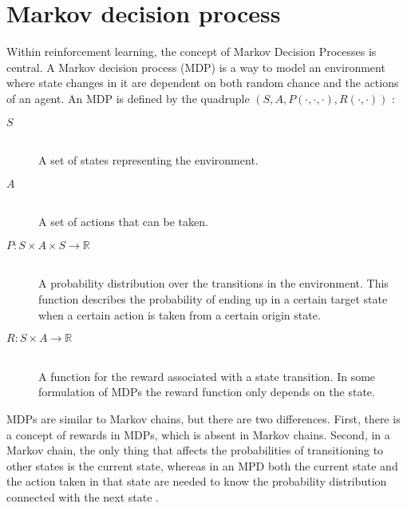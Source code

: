 \section{Markov decision process}

Within reinforcement learning, the concept of Markov Decision Processes is central. A Markov decision process (MDP) is a way to model an environment where state changes in it are dependent on both random chance and the actions of an agent. An MDP is defined by the quadruple $\left( S, A, P( \cdot , \cdot, \cdot ) , R( \cdot , \cdot ) \right)$ \parencite{altman2002applications}: 

\begin{description}
\item[$S$] \hfill \\ 
    A set of states representing the environment.
\item[$A$] \hfill \\ 
    A set of actions that can be taken.
\item[$P \colon S \times A \times S \to \mathbb R$] \hfill \\ 
    A probability distribution over the transitions in the environment. This function describes the probability of ending up in a certain target state when a certain action is taken from a certain origin state. 
\item[$R \colon S \times A \to \mathbb{R}$] \hfill \\ 
    A function for the reward associated with a state transition. In some formulation of MDPs the reward function only depends on the state.
\end{description}

MDPs are similar to Markov chains, but there are two differences. First, there is a concept of rewards in MDPs, which is absent in Markov chains. Second, in a Markov chain, the only thing that affects the probabilities of transitioning to other states is the current state, whereas in an MPD both the current state and the action taken in that state are needed to know the probability distribution connected with the next state \parencite{altman2002applications}.




